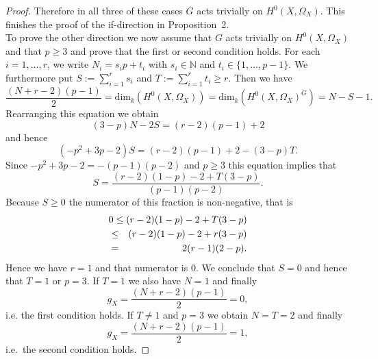 \documentclass[11pt]{article} %
\theoremstyle{remark}\newtheorem*{rem}{Remark}
\newcommand{\NN}{{\mathbb N}}
\begin{document}
\begin{proof}
    Therefore in all three of these cases $G$ acts trivially on $H^0(X,\Omega_X)$.
    This finishes the proof of the if-direction in Proposition~2.\\
    To prove the other direction we now assume that $G$ acts trivially on $H^0(X, \Omega_X)$ and that $p \ge 3$ and prove that the first or second condition holds. 
    For each $i=1, \ldots, r$, we write $N_i = s_i p +t_i$ with $s_i \in \NN$ and $t_i \in \{1, \ldots, p-1\}$. 
    We furthermore put $S:=\sum_{i=1}^r s_i$ and $T:= \sum_{i=1}^r t_i \ge r$. 
    Then we have
      \[ 
	 \frac{(N+r-2)(p-1)}{2} =\textrm{dim}_k(H^0(X,\Omega_X))  = \textrm{dim}_k\left(H^0(X,\Omega_X)^G\right) = N-S-1 .
      \]
    Rearranging this equation we obtain
      \[
	 (3-p)N - 2S = (r-2)(p-1) +2  
      \]
    and hence
      \[
	 (-p^2 + 3p -2)S = (r-2)(p-1) +2 - (3-p)T.
      \]
    Since $-p^2+3p-2 = - (p-1)(p-2)$ and $p \ge 3$ this equation implies that
      \[ 
	S = \frac{(r-2)(1-p)-2 + T (3-p)}{(p-1)(p-2)}. 
      \]
    Because $S \ge 0$ the numerator of this fraction is non-negative, that is
      \begin{eqnarray*}
	\lefteqn{0 \le (r-2)(1-p) - 2 + T (3-p)}\\
	&\le & (r-2)(1-p) - 2 + r (3-p)\\
	&=& 2 (r-1)(2-p).
      \end{eqnarray*}
    Hence we have $r=1$ and that numerator is $0$. 
    We conclude that $S=0$ and hence that $T=1$ or $p=3$. 
    If $T=1$ we also have $N=1$ and finally
      \[
	g_X = \frac{(N+r-2)(p-1)}{2} = 0,
      \]
    i.e. the first condition holds. 
    If $T \not=1$ and $p=3$ we obtain $N=T=2$ and finally 
      \[
	g_X = \frac{(N+r-2)(p-1)}{2} =1,
      \] 
    i.e.\
    the second condition holds.
  \end{proof}
\end{document}

